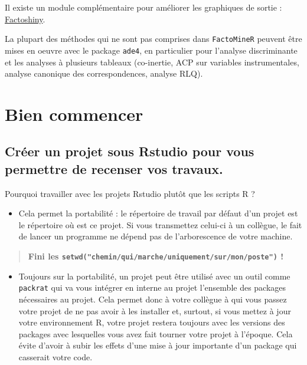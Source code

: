 \documentclass[]{book}
\providecommand{\tightlist}{%
  \setlength{\itemsep}{0pt}\setlength{\parskip}{0pt}}
\begin{document}
Il existe un module complémentaire pour améliorer les graphiques de sortie : \href{http://factominer.free.fr/graphs/factoshiny-fr.html}{Factoshiny}.

La plupart des méthodes qui ne sont pas comprises dans \texttt{FactoMineR} peuvent être mises en oeuvre avec le package \texttt{ade4}, en particulier pour l'analyse discriminante et les analyses à plusieurs tableaux (co-inertie, ACP sur variables instrumentales, analyse canonique des correspondences, analyse RLQ).

\hypertarget{bien-commencer}{%
\chapter{Bien commencer}\label{bien-commencer}}

\hypertarget{creer-un-projet-sous-rstudio-pour-vous-permettre-de-recenser-vos-travaux.}{%
\section{Créer un projet sous Rstudio pour vous permettre de recenser vos travaux.}\label{creer-un-projet-sous-rstudio-pour-vous-permettre-de-recenser-vos-travaux.}}

Pourquoi travailler avec les projets Rstudio plutôt que les scripts R ?

\begin{itemize}
\tightlist
\item
  Cela permet la portabilité : le répertoire de travail par défaut d'un projet est le répertoire où est ce projet. Si vous transmettez celui-ci à un collègue, le fait de lancer un programme ne dépend pas de l'arborescence de votre machine.
\end{itemize}

\begin{quote}
\textbf{Fini les \texttt{setwd("chemin/qui/marche/uniquement/sur/mon/poste")} !}
\end{quote}

\begin{itemize}
\tightlist
\item
  Toujours sur la portabilité, un projet peut être utilisé avec un outil comme \texttt{packrat} qui va vous intégrer en interne au projet l'ensemble des packages nécessaires au projet. Cela permet donc à votre collègue à qui vous passez votre projet de ne pas avoir à les installer et, surtout, si vous mettez à jour votre environnement R, votre projet restera toujours avec les versions des packages avec lesquelles vous avez fait tourner votre projet à l'époque. Cela évite d'avoir à subir les effets d'une mise à jour importante d'un package qui casserait votre code.
\end{itemize}
\end{document}
